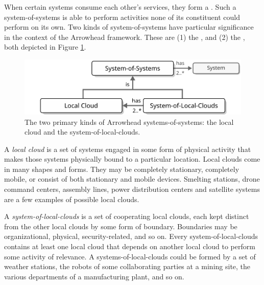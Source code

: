 When certain systems consume each other's services, they form a .
Such a system-of-systems is able to perform activities none of its constituent  could perform on its own.
Two kinds of system-of-systems have particular significance in the context of the Arrowhead framework.
These are (1) the , and (2) the , both depicted in Figure \ref{fig:system-of-systems}.

\begin{figure}[ht!]
  \centering
  \includegraphics[scale=0.9]{figures/system-of-systems}
  \caption{
    The two primary kinds of Arrowhead systems-of-systems: the local cloud and the system-of-local-clouds.
  }
  \label{fig:system-of-systems}
\end{figure}

A \textit{local cloud} is a set of systems engaged in some form of physical activity that makes those systems physically bound to a particular location.
Local clouds come in many shapes and forms.
They may be completely stationary, completely mobile, or consist of both stationary and mobile devices.
Smelting stations, drone command centers, assembly lines, power distribution centers and satellite systems are a few examples of possible local clouds.

A \textit{system-of-local-clouds} is a set of cooperating local clouds, each kept distinct from the other local clouds by some form of boundary.
Boundaries may be organizational, physical, security-related, and so on.
Every system-of-local-clouds contains at least one local cloud that depends on another local cloud to perform some activity of relevance.
A systems-of-local-clouds could be formed by a set of weather stations, the robots of some collaborating parties at a mining site, the various departments of a manufacturing plant, and so on.
